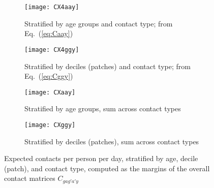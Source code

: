 \begin{figure}
  \begin{subfigure}{\linewidth}
    \texttt{[image: CX4aay]}
    \caption{Stratified by age groups and contact type; from Eq.~(\ref{eq:Caay})}
    \label{fig:CX4aay}
  \end{subfigure}
  \begin{subfigure}{\linewidth}
    \texttt{[image: CX4ggy]}
    \caption{Stratified by deciles (patches) and contact type; from Eq.~(\ref{eq:Cggy})}
    \label{fig:CX4ggy}
  \end{subfigure}
  \begin{subfigure}{0.48\linewidth}
    \centering
    \texttt{[image: CXaay]}
    \caption{Stratified by age groups, sum across contact types}
    \label{fig:CXaay}
  \end{subfigure}\hfill%
  \begin{subfigure}{0.48\linewidth}
    \centering
    \texttt{[image: CXggy]}
    \caption{Stratified by deciles (patches), sum across contact types}
    \label{fig:CXggy}
  \end{subfigure}
  \caption{Expected contacts per person per day, stratified by age, decile (patch), and contact type,
    computed as the margins of the overall contact matrices $C_{gag'a'y}$}
  \label{fig:CX4y}
\end{figure}